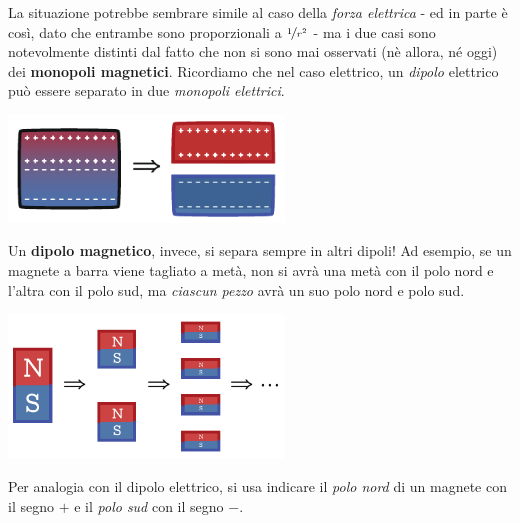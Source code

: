 La situazione potrebbe sembrare simile al caso della \textit{forza elettrica} - ed in parte è così, dato che entrambe sono proporzionali a $\nicefrac{1}{r^2}$ - ma i due casi sono notevolmente distinti dal fatto che non si sono mai osservati (nè allora, né oggi) dei \textbf{monopoli magnetici}. Ricordiamo che nel caso elettrico, un \textit{dipolo} elettrico può essere separato in due \textit{monopoli elettrici}.
\begin{center}
	\includegraphics[width=0.55\textwidth]{images/chp7/chp7assenzamonopoli1.pdf}
\end{center}
Un \textbf{dipolo magnetico}, invece, si separa sempre in altri dipoli! Ad esempio, se un magnete a barra viene tagliato a metà, non si avrà una metà con il polo nord e l'altra con il polo sud, ma \textit{ciascun pezzo} avrà un suo polo nord e polo sud.
\begin{center}
	\includegraphics[width=0.55\textwidth]{images/chp7/chp7assenzamonopoli2.pdf}
\end{center}
\begin{observe}
	Per analogia con il dipolo elettrico, si usa indicare il \textit{polo nord} di un magnete con il segno $+$ e il \textit{polo sud} con il segno $-$.
\end{observe}
